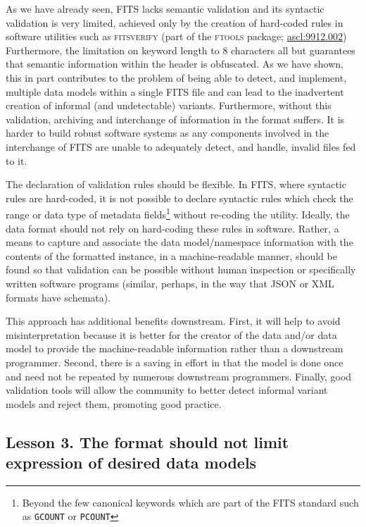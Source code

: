 \documentclass[final,authoryear,5p,times,twocolumn]{elsarticle}
\begin{document}
{{As we have already seen, FITS lacks semantic validation and its
syntactic validation is very limited, achieved only by the creation
of hard-coded rules in software utilities such as \textsc{fitsverify}
(part of the \textsc{ftools} package; \href{http://ascl.net/9912.002}{ascl:9912.002})
Furthermore, the limitation on
keyword length to 8 characters all but guarantees that semantic
information within the header is obfuscated. As we have shown,
this in part contributes to the problem of being able to detect,
and implement, multiple data models within a single FITS file
and can lead to the inadvertent creation of informal (and
undetectable) variants. Furthermore, without this validation,
archiving and interchange of information in the format suffers.
It is harder to build robust software systems as any components
involved in the interchange of FITS are unable to adequately 
detect, and handle, invalid files fed to it.

The declaration of validation rules should be flexible. In FITS,
where syntactic rules are hard-coded, it is not possible to
declare syntactic rules which check the range or data type of
metadata fields\footnote{Beyond the few canonical keywords
which are part of the FITS standard such as \texttt{GCOUNT}
or \texttt{PCOUNT}} without re-coding the utility.
Ideally, the data format should not rely on hard-coding these rules
in software. Rather, a means to capture and associate the data
model/namespace information with the contents of the formatted
instance, in a machine-readable manner, should be found so that
validation can be possible without human inspection or specifically
written software programs (similar, perhaps, in the way that JSON
or XML formats have schemata).


This approach has additional benefits downstream. First, it will help
to avoid misinterpretation because it is better for the creator
of the data and/or data model to provide the machine-readable information rather
than a downstream programmer. Second, there is a saving in effort
in that the model is done once and need not be repeated by numerous
downstream programmers. Finally, good validation tools will allow the community
to better detect informal variant models and reject them, promoting good
practice.


\subsection{Lesson 3. The format should not limit expression of desired data models}

}}
\end{document}
